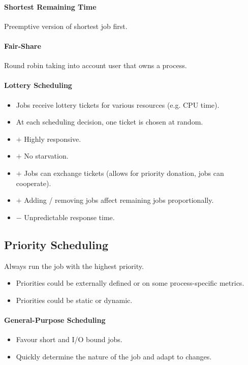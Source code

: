 \documentclass[twocolumn,english]{article}
\begin{document}
\paragraph{Shortest Remaining Time}

Preemptive version of shortest job first.


\paragraph{Fair-Share}

Round robin taking into account user that owns a process.


\paragraph{Lottery Scheduling}
\begin{itemize}
\item Jobs receive lottery tickets for various resources (e.g. CPU time). 
\item At each scheduling decision, one ticket is chosen at random. 
\item $+$ Highly responsive. 
\item $+$ No starvation. 
\item $+$ Jobs can exchange tickets (allows for priority donation, jobs
can cooperate). 
\item $+$ Adding / removing jobs affect remaining jobs proportionally. 
\item $-$ Unpredictable response time. 
\end{itemize}

\subsection{Priority Scheduling}

Always run the job with the highest priority. 
\begin{itemize}
\item Priorities could be externally defined or on some process-specific
metrics. 
\item Priorities could be static or dynamic. 
\end{itemize}

\paragraph{General-Purpose Scheduling}
\begin{itemize}
\item Favour short and I/O bound jobs. 
\item Quickly determine the nature of the job and adapt to changes. 
\end{itemize}
\end{document}
